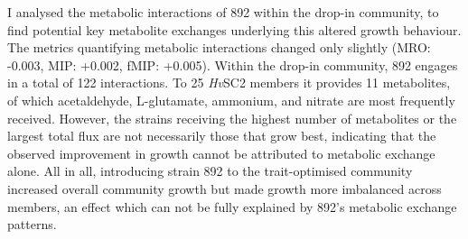 I analysed the metabolic interactions of 892 within the drop-in community, to find potential key metabolite exchanges underlying this altered growth behaviour. The metrics quantifying metabolic interactions changed only slightly (MRO: -0.003, MIP: +0.002, fMIP: +0.005).  Within the drop-in community, 892 engages in a total of 122 interactions. To 25 \textit{Hv}SC2 members it provides 11 metabolites, of which acetaldehyde, L-glutamate, ammonium, and nitrate are most frequently received. However, the strains receiving the highest number of metabolites or the largest total flux are not necessarily those that grow best, indicating that the observed improvement in growth cannot be attributed to metabolic exchange alone.
All in all, introducing strain 892 to the trait-optimised community increased overall community growth but made growth more imbalanced across members, an effect which can not be fully explained by 892's metabolic exchange patterns. 